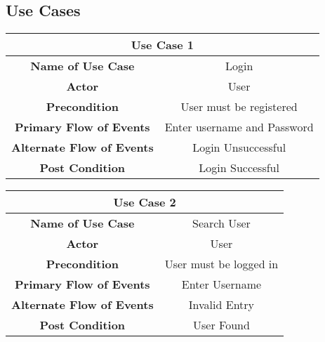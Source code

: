 \subsection{Use Cases}
\begin{center}
    \begin{tabular}{|c|c|}
        \hline
        \multicolumn{2}{|c|}{Use Case 1} \\
        \hline
        \textbf{Name of Use Case} & Login \\
        \hline
        \textbf{Actor} & User \\
        \hline
        \textbf{Precondition} & User must be registered \\
        \hline
        \textbf{Primary Flow of Events} & Enter username and Password \\
        \hline
        \textbf{Alternate Flow of Events} & Login Unsuccessful \\
        \hline
        \textbf{Post Condition} & Login Successful \\
        \hline
    \end{tabular}
\end{center}

\vspace{1cm}
\begin{center}
    \begin{tabular}{|c|c|}
        \hline
        \multicolumn{2}{|c|}{Use Case 2} \\
        \hline
        \textbf{Name of Use Case} & Search User \\
        \hline
        \textbf{Actor} & User \\
        \hline
        \textbf{Precondition} & User must be logged in \\
        \hline
        \textbf{Primary Flow of Events} & Enter Username \\
        \hline
        \textbf{Alternate Flow of Events} & Invalid Entry \\
        \hline
        \textbf{Post Condition} & User Found \\
        \hline
    \end{tabular}
\end{center}

